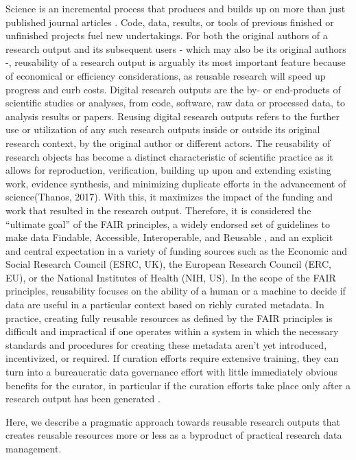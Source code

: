 Science is an incremental process that produces and builds up on more than just published journal articles \citep{mons2018data}.
Code, data, results, or tools of previous finished or unfinished projects fuel new undertakings.
For both the original authors of a research output and its subsequent users - which may also be its original authors -, reusability of a research output is arguably its most important feature because of economical or efficiency considerations, as reusable research will speed up progress and curb costs.
Digital research outputs are the by- or end-products of scientific studies or analyses, from code, software, raw data or processed data, to analysis results or papers.
Reusing digital research outputs refers to the further use or utilization of any such research outputs inside or outside its original research context, by the original author or different actors.
The reusability of research objects has become a distinct characteristic of scientific practice as it allows for reproduction, verification, building up upon and extending existing work, evidence synthesis, and minimizing duplicate efforts in the advancement of science(Thanos, 2017).
With this, it maximizes the impact of the funding and work that resulted in the research output.
Therefore, it is considered the “ultimate goal” of the FAIR principles, a widely endorsed set of guidelines to make data Findable, Accessible, Interoperable, and Reusable \citep{wilkinson2016fair}, and an explicit and central expectation in a variety of funding sources such as the Economic and Social Research Council (ESRC, UK), the European Research Council (ERC, EU), or the National Institutes of Health (NIH, US).
In the scope of the FAIR principles, reusability focuses on the ability of a human or a machine to decide if data are useful in a particular context based on richly curated metadata.
In practice, creating fully reusable resources as defined by the FAIR principles is difficult and impractical if one operates within a system in which the necessary standards and procedures for creating these metadata aren’t yet introduced, incentivized, or required.
If curation efforts require extensive training, they can turn into a bureaucratic data governance effort with little immediately obvious benefits for the curator, in particular if the curation efforts take place only after a research output has been generated \citep{zehl2016handling}.

Here, we describe a pragmatic approach towards reusable research outputs that creates reusable resources more or less as a byproduct of practical research data management.

